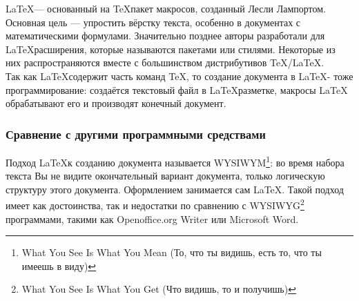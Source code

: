 \documentclass{article}
\begin{document}
	\LaTeX  — основанный на \TeX пакет макросов, созданный Лесли Лампортом. Основная цель — упростить вёрстку текста, особенно в документах с математическими формулами. Значительно позднее авторы разработали для \LaTeX расширения, которые называются пакетами или стилями. Некоторые из них распространяются вместе с большинством дистрибутивов \TeX/\LaTeX.\\

	Так как \LaTeX содержит часть команд \TeX, то создание документа в \LaTeX - тоже программирование: создаётся текстовый файл в \LaTeX разметке, макросы LaTeX обрабатывают его и производят конечный документ.\\
		\subsubsection{Сравнение с другими программными средствами}
	Подход \LaTeX к созданию документа называется WYSIWYM\footnote{What You See Is What You Mean (То, что ты видишь, есть то, что ты имеешь в виду)}: во время набора текста Вы не видите окончательный вариант документа, только логическую структуру этого документа. Оформлением занимается сам \LaTeX. Такой подход имеет как достоинства, так и недостатки по сравнению с WYSIWYG\footnote{What You See Is What You Get (Что видишь, то и получишь)} программами, такими как Openoffice.org Writer или Microsoft Word.\\
\end{document}
